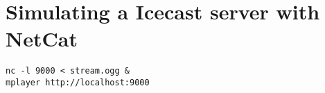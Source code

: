 \section{Simulating a Icecast server with NetCat}
\begin{verbatim}
nc -l 9000 < stream.ogg &
mplayer http://localhost:9000
\end{verbatim}


\begin{comment}
\part*{Lab}\addcontentsline{toc}{part}{Lab}

\hrule
\chapter{\href{http://www.icecast.org/docs/icecast-trunk/icecast2_relay.html}{Relaying}}

\section{Objectives}

\begin{enumerate}
\item Learn to configure a Icecast2 server as a ``Master'' Server and
  a ``Slave'' (Relay) Server.
\end{enumerate}


\section{The configuration}

\begin{itemize}
\item Using the \texttt{150.214.150.68:4551} as the ``Master'' Server,
  install a ``Slave'' (Relay) Server in one of your homes.
\item Propagate the content from one home at least to another home.
\item Check that a number of local listeners can be attached to each
  server.
\item Example:
\end{itemize}
\begin{center}
\texttt{[image: configuration]}
\end{center}


\end{comment}
